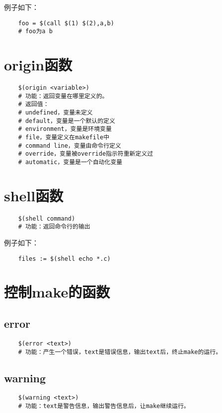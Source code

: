 \documentclass[a4paper,left=2.5cm,right=2.5cm,11pt]{article}
\begin{document}
	例子如下：
	\begin{lstlisting}
	foo = $(call $(1) $(2),a,b)
	# foo为a b
	\end{lstlisting}

\section{origin函数}
	\begin{lstlisting}
	$(origin <variable>)
	# 功能：返回变量在哪里定义的。
	# 返回值：
	# undefined，变量未定义
	# default，变量是一个默认的定义
	# environment，变量是环境变量
	# file，变量定义在makefile中
	# command line，变量由命令行定义
	# override，变量被override指示符重新定义过
	# automatic，变量是一个自动化变量
	\end{lstlisting}

\section{shell函数}
	\begin{lstlisting}
	$(shell command)
	# 功能：返回命令行的输出
	\end{lstlisting}

	例子如下：
	\begin{lstlisting}
	files := $(shell echo *.c)
	\end{lstlisting}

\section{控制make的函数}
\subsection{error}
	\begin{lstlisting}
	$(error <text>)
	# 功能：产生一个错误，text是错误信息，输出text后，终止make的运行。
	\end{lstlisting}

\subsection{warning}
	\begin{lstlisting}
	$(warning <text>)
	# 功能：text是警告信息，输出警告信息后，让make继续运行。
	\end{lstlisting}
\end{document}
